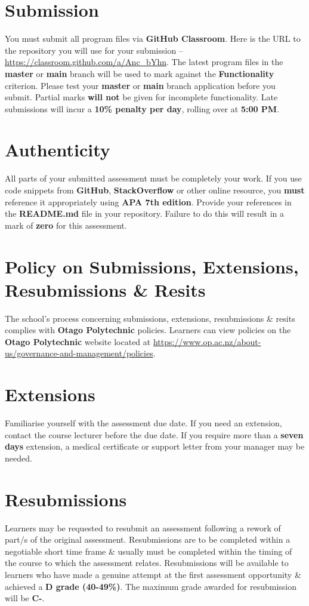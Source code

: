 \documentclass{article}
\begin{document}
\section*{Submission}
You must submit all program files via \textbf{GitHub Classroom}. Here is the URL to the repository you will use for your submission – \href{https://classroom.github.com/a/Anc\_bYhn}{https://classroom.github.com/a/Anc\_bYhn}. The latest program files in the \textbf{master} or \textbf{main} branch will be used to mark against the \textbf{Functionality} criterion. Please test your \textbf{master} or \textbf{main} branch application before you submit. Partial marks \textbf{will not} be given for incomplete functionality. Late submissions will incur a \textbf{10\% penalty per day}, rolling over at \textbf{5:00 PM}.

\section*{Authenticity}
All parts of your submitted assessment must be completely your work. If you use code snippets from \textbf{GitHub}, \textbf{StackOverflow} or other online resource, you \textbf{must} reference it appropriately using \textbf{APA 7th edition}. Provide your references in the \textbf{README.md} file in your repository. Failure to do this will result in a mark of \textbf{zero} for this assessment.

\section*{Policy on Submissions, Extensions, Resubmissions \& Resits}
The school's process concerning submissions, extensions, resubmissions \& resits complies with \textbf{Otago Polytechnic} policies. Learners can view policies on the \textbf{Otago Polytechnic} website located at \href{https://www.op.ac.nz/about-us/governance-and-management/policies}{https://www.op.ac.nz/about-us/governance-and-management/policies}.

\section*{Extensions}
Familiarise yourself with the assessment due date. If you need an extension, contact the course lecturer before the due date. If you require more than a \textbf{seven days} extension, a medical certificate or support letter from your manager may be needed.

\section*{Resubmissions}
Learners may be requested to resubmit an assessment following a rework of part/s of the original assessment. Resubmissions are to be completed within a negotiable short time frame \& usually must be completed within the timing of the course to which the assessment relates. Resubmissions will be available to learners who have made a genuine attempt at the first assessment opportunity \& achieved a \textbf{D grade (40-49\%)}. The maximum grade awarded for resubmission will be \textbf{C-}.
\end{document}
